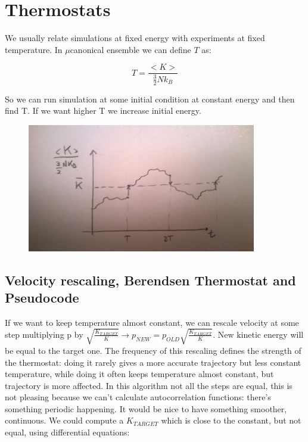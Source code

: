 \documentclass[a4paper, italian, openany]{book}
\begin{document}
\section{Thermostats}

We usually relate simulations at fixed energy with experiments at fixed temperature.\newline
In $\mu$canonical ensemble we can define $T$ as: 

$$T = \frac{<K>}{\frac{3}{2}N k_B}$$

So we can run simulation at some initial condition at constant energy and then find T. If we want higher T we increase initial energy.

\begin{figure}[H]
\centering
\includegraphics[width=100mm]{img/pic21.jpg}
\end{figure}

\subsection{Velocity rescaling, Berendsen Thermostat and Pseudocode}

If we want to keep temperature almost constant, we can rescale velocity at some step multiplying p by $\sqrt{\frac{K_{TARGET}}{K}} \rightarrow p_{NEW} = p_{OLD}\sqrt{\frac{K_{TARGET}}{K}}$. New kinetic energy will be equal to the target one. The frequency of this rescaling defines the strength of the thermostat: doing it rarely gives a more accurate trajectory but less constant temperature, while doing it often keeps temperature almost constant, but trajectory is more affected.\newline
In this algorithm not all the steps are equal, this is not pleasing because we can't calculate autocorrelation functions: there's something periodic happening. It would be nice to have something smoother, continuous.\newline
We could compute a $K_{TARGET}$ which is close to the constant, but not equal, using differential equations:
\end{document}
